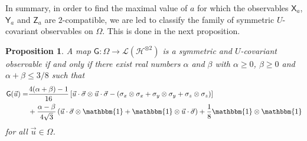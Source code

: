 \documentclass[12pt]{amsart}
\newtheorem{proposition}{Proposition}
\theoremstyle{definition}
\newcommand{\hh}{\mathcal{H}} %
\newcommand{\elle}[1]{\mathcal{L}(#1)} %
\newcommand{\id}{\mathbbm{1}} %
\newcommand{\G}{\mathsf{G}}%
\newcommand{\X}{\mathsf{X}}%
\newcommand{\Y}{\mathsf{Y}}%
\newcommand{\Z}{\mathsf{Z}}%
\begin{document}
In summary, in order to find the maximal value of $a$ for which the observables $\X_a$, $\Y_a$ and $\Z_a$ are $2$-compatible, we are led to classify the family of symmetric $U$-covariant observables on $\Omega$. This is done in the next proposition.

\begin{proposition}\label{prop:Ucovar}
A map $\G:\Omega\to\elle{\hh^{\otimes 2}}$ is a symmetric and $U$-covariant observable if and only if there exist real numbers $\alpha$ and $\beta$ with $\alpha\geq 0$, $\beta\geq 0$ and $\alpha+\beta\leq 3/8$ such that
\begin{align}\label{eq:covar}
\begin{aligned}
\G(\vec{u}) = & \frac{4(\alpha+\beta)-1}{16} \left[\vec{u}\cdot\vec{\sigma}\otimes\vec{u}\cdot\vec{\sigma} - (\sigma_x\otimes\sigma_x + \sigma_y\otimes\sigma_y + \sigma_z\otimes\sigma_z)\right] \\
& + \frac{\alpha-\beta}{4\sqrt{3}} \left(\vec{u}\cdot\vec{\sigma}\otimes\id + \id\otimes\vec{u}\cdot\vec{\sigma}\right) + \frac{1}{8} \id\otimes\id
\end{aligned}
\end{align}
for all $\vec{u}\in\Omega$.
\end{proposition}
\end{document}
